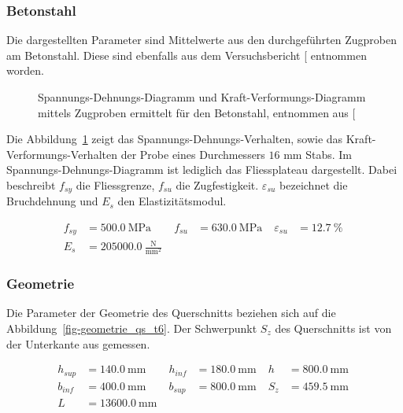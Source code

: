 \documentclass[
  11pt,
  letterpaper,
]{scrreprt}
\begin{document}
\subsubsection{Betonstahl}\label{betonstahl}

Die dargestellten Parameter sind Mittelwerte aus den durchgeführten
Zugproben am Betonstahl. Diese sind ebenfalls aus dem Versuchsbericht
{[}\citeproc{ref-sigrist_versuche_1993}{5}{]} entnommen worden.

\begin{figure}[H]


\caption{\label{fig-sigma_eps_betonstahl}Spannungs-Dehnungs-Diagramm und
Kraft-Verformungs-Diagramm mittels Zugproben ermittelt für den
Betonstahl, entnommen aus {[}\citeproc{ref-sigrist_versuche_1993}{5}{]}}

\end{figure}%

Die Abbildung~\ref{fig-sigma_eps_betonstahl} zeigt das
Spannungs-Dehnungs-Verhalten, sowie das Kraft-Verformungs-Verhalten der
Probe eines Durchmessers \(16\) mm Stabs. Im Spannungs-Dehnungs-Diagramm
ist lediglich das Fliessplateau dargestellt. Dabei beschreibt \(f_{sy}\)
die Fliessgrenze, \(f_{su}\) die Zugfestigkeit. \(\varepsilon_{su}\)
bezeichnet die Bruchdehnung und \(E_s\) den Elastizitätsmodul.

$$
\begin{aligned}
f_{sy} &= 500.0\ \mathrm{MPa} \; 
 &f_{su} &= 630.0\ \mathrm{MPa} \; 
 &\varepsilon_{su} &= 12.7\ \mathrm{\%} \; 
\\[11pt]
 E_{s} &= 205000.0\ \frac{\mathrm{N}}{\mathrm{mm}^{2}} \;
\end{aligned}
$$

\subsubsection{Geometrie}\label{geometrie}

Die Parameter der Geometrie des Querschnitts beziehen sich auf die
Abbildung~\ref{fig-geometrie_qs_t6}. Der Schwerpunkt \(S_z\) des
Querschnitts ist von der Unterkante aus gemessen.

$$
\begin{aligned}
h_{sup} &= 140.0\ \mathrm{mm} \; 
 &h_{inf} &= 180.0\ \mathrm{mm} \; 
 &h &= 800.0\ \mathrm{mm} \; 
\\[11pt]
 b_{inf} &= 400.0\ \mathrm{mm} \; 
 &b_{sup} &= 800.0\ \mathrm{mm} \; 
 &S_{z} &= 459.5\ \mathrm{mm} \; 
\\[11pt]
 L &= 13600.0\ \mathrm{mm} \;
\end{aligned}
$$
\end{document}
